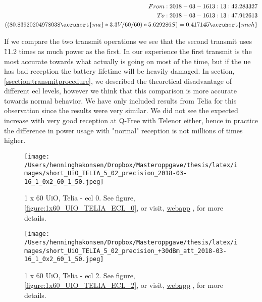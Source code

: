 \documentclass[USenglish]{ifimaster}  %
\begin{document}
\begin{equation*} \label{equation:ecl2}
\begin{aligned}
From: 2018-03-16 13:13:42.283327 \\
To: 2018-03-16 13:13:47.912613 \\
((80.83920204978038\acrshort{ma} * 3.3V / 60 / 60 ) * 5.629286S) = 0.417145\acrshort{mwh} \\
\end{aligned}
\end{equation*}

If we compare the two transmit operations we see that the second transmit uses \~11.2 times as much power as the first. In our experience the first transmit is the most accurate towards what actually is going on most of the time, but if the \acrshort{ue} has bad reception the battery lifetime will be heavily damaged. In section, \vref{ssection:transmitprocedure}, we described the theoretical disadvantage of different \acrshort{ecl} levels, however we think that this comparison is more accurate towards normal behavior. We have only included results from Telia for this observation since the results were very similar. We did not see the expected increase with very good reception at Q-Free with Telenor either, hence in practice the difference in power usage with "normal" reception is not millions of times higher.

\begin{figure}[H]
  \centering
  \texttt{[image: /Users/henninghakonsen/Dropbox/Masteroppgave/thesis/latex/images/short\_UiO\_TELIA\_5\_02\_precision\_2018-03-16\_1\_0x2\_60\_1\_50.jpeg]}
  \caption{1 x 60 UiO, Telia - \acrshort{ecl} 0. See figure, \vref{figure:1x60_UIO_TELIA_ECL_0}, or visit, \href{http://158.39.77.97:9000/\#/results/UiO\_TELIA\_5.02\_precision\_2018-03-16\_1\_0x2\_60\_1\_50}{webapp} \cite{online:result5}, for more details.}
  \label{figure:1x60_UIO_TELIA_ECL_0_SHORT}
\end{figure}

\begin{figure}[H]
  \centering
  \texttt{[image: /Users/henninghakonsen/Dropbox/Masteroppgave/thesis/latex/images/short\_UiO\_TELIA\_5\_02\_precision\_+30dBm\_att\_2018-03-16\_1\_0x2\_60\_1\_50.jpeg]}
  \caption{1 x 60 UiO, Telia - \acrshort{ecl} 2. See figure, \vref{figure:1x60_UIO_TELIA_ECL_2}, or visit, \href{http://158.39.77.97:9000/\#/results/UiO\_TELIA\_5.02\_precision\_+30dBm\_att\_2018-03-16\_1\_0x2\_60\_1\_50}{webapp} \cite{online:result6}, for more details.}
  \label{figure:1x60_UIO_TELIA_ECL_2_SHORT}
\end{figure}
\end{document}
